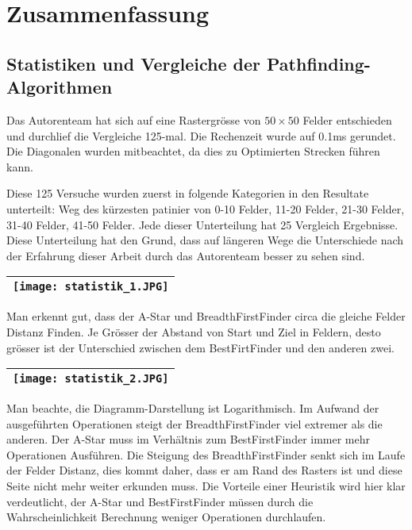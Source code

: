\chapter{Zusammenfassung}
\section{Statistiken und Vergleiche der Pathfinding-Algorithmen}
\begin{center}
\end{center}

Das Autorenteam hat sich auf eine Rastergrösse von $50\times 50$ Felder
entschieden und durchlief die Vergleiche 125-mal. Die Rechenzeit wurde
auf 0.1ms gerundet. Die Diagonalen wurden mitbeachtet, da dies zu
Optimierten Strecken führen kann.

Diese 125 Versuche wurden zuerst in folgende Kategorien in den Resultate
unterteilt: Weg des kürzesten patinier von 0-10 Felder, 11-20 Felder,
21-30 Felder, 31-40 Felder, 41-50 Felder. Jede dieser Unterteilung hat
25 Vergleich Ergebnisse. Diese Unterteilung hat den Grund, dass auf
längeren Wege die Unterschiede nach der Erfahrung dieser Arbeit durch
das Autorenteam besser zu sehen sind.

\begin{longtable}[]{@{}l@{}}
\toprule
\endhead
\texttt{[image: statistik\_1.JPG]}\tabularnewline
\bottomrule
\end{longtable}

Man erkennt gut, dass der A-Star und BreadthFirstFinder circa die gleiche
Felder Distanz Finden. Je Grösser der Abstand von Start und Ziel in
Feldern, desto grösser ist der Unterschied zwischen dem BestFirtFinder
und den anderen zwei.

\begin{longtable}[]{@{}l@{}}
\toprule
\endhead
\texttt{[image: statistik\_2.JPG]}\tabularnewline
\bottomrule
\end{longtable}

Man beachte, die Diagramm-Darstellung ist Logarithmisch. Im Aufwand der
ausgeführten Operationen steigt der BreadthFirstFinder viel extremer als
die anderen. Der A-Star muss im Verhältnis zum BestFirstFinder immer
mehr Operationen Ausführen. Die Steigung des BreadthFirstFinder senkt
sich im Laufe der Felder Distanz, dies kommt daher, dass er am Rand des
Rasters ist und diese Seite nicht mehr weiter erkunden muss. Die
Vorteile einer Heuristik wird hier klar verdeutlicht, der A-Star und
BestFirstFinder müssen durch die Wahrscheinlichkeit Berechnung weniger
Operationen durchlaufen.

